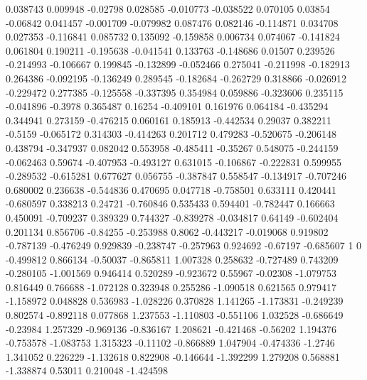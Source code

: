 0.038743 0.009948   
-0.02798 0.028585   
-0.010773 -0.038522   
0.070105 0.03854   
-0.06842 0.041457   
-0.001709 -0.079982   
0.087476 0.082146   
-0.114871 0.034708   
0.027353 -0.116841   
0.085732 0.135092   
-0.159858 0.006734   
0.074067 -0.141824   
0.061804 0.190211   
-0.195638 -0.041541   
0.133763 -0.148686   
0.01507 0.239526   
-0.214993 -0.106667   
0.199845 -0.132899   
-0.052466 0.275041   
-0.211998 -0.182913   
0.264386 -0.092195   
-0.136249 0.289545   
-0.182684 -0.262729   
0.318866 -0.026912   
-0.229472 0.277385   
-0.125558 -0.337395   
0.354984 0.059886   
-0.323606 0.235115   
-0.041896 -0.3978   
0.365487 0.16254   
-0.409101 0.161976   
0.064184 -0.435294   
0.344941 0.273159   
-0.476215 0.060161   
0.185913 -0.442534   
0.29037 0.382211   
-0.5159 -0.065172   
0.314303 -0.414263   
0.201712 0.479283   
-0.520675 -0.206148   
0.438794 -0.347937   
0.082042 0.553958   
-0.485411 -0.35267   
0.548075 -0.244159   
-0.062463 0.59674   
-0.407953 -0.493127   
0.631015 -0.106867   
-0.222831 0.599955   
-0.289532 -0.615281   
0.677627 0.056755   
-0.387847 0.558547   
-0.134917 -0.707246   
0.680002 0.236638   
-0.544836 0.470695   
0.047718 -0.758501   
0.633111 0.420441   
-0.680597 0.338213   
0.24721 -0.760846   
0.535433 0.594401   
-0.782447 0.166663   
0.450091 -0.709237   
0.389329 0.744327   
-0.839278 -0.034817   
0.64149 -0.602404   
0.201134 0.856706   
-0.84255 -0.253988   
0.8062 -0.443217   
-0.019068 0.919802   
-0.787139 -0.476249   
0.929839 -0.238747   
-0.257963 0.924692   
-0.67197 -0.685607   
1 0   
-0.499812 0.866134   
-0.50037 -0.865811   
1.007328 0.258632   
-0.727489 0.743209   
-0.280105 -1.001569   
0.946414 0.520289   
-0.923672 0.55967   
-0.02308 -1.079753   
0.816449 0.766688   
-1.072128 0.323948   
0.255286 -1.090518   
0.621565 0.979417   
-1.158972 0.048828   
0.536983 -1.028226   
0.370828 1.141265   
-1.173831 -0.249239   
0.802574 -0.892118   
0.077868 1.237553   
-1.110803 -0.551106   
1.032528 -0.686649   
-0.23984 1.257329   
-0.969136 -0.836167   
1.208621 -0.421468   
-0.56202 1.194376   
-0.753578 -1.083753   
1.315323 -0.11102   
-0.866889 1.047904   
-0.474336 -1.2746   
1.341052 0.226229   
-1.132618 0.822908   
-0.146644 -1.392299   
1.279208 0.568881   
-1.338874 0.53011   
0.210048 -1.424598   
